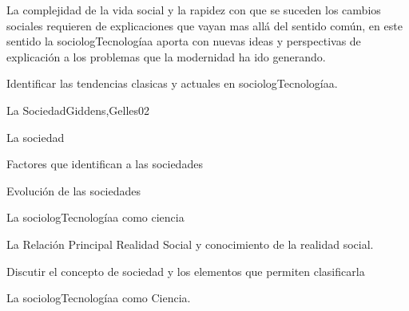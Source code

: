 \begin{syllabus}


\begin{justification}
La complejidad de la vida social y la rapidez con que se suceden los cambios sociales requieren 
de explicaciones que vayan mas allá del sentido común, en este sentido la sociologTecnologíaa 
aporta con nuevas ideas y perspectivas de explicación a los problemas que la modernidad 
ha ido generando.
\end{justification}

\begin{goals}
\item Identificar las tendencias clasicas y actuales en sociologTecnologíaa.
\end{goals}

\begin{outcomes}
\end{outcomes}

\begin{unit}{La Sociedad}{Giddens,Gelles}{0}{2}
    \begin{topics}
      \item La sociedad
      \item Factores que identifican a las sociedades
      \item Evolución de las sociedades
      \item La sociologTecnologíaa como ciencia
      \item La Relación Principal Realidad Social y conocimiento de la realidad social.
    \end{topics}
    \begin{learningoutcomes}
      \item Discutir el concepto de sociedad y los elementos que permiten clasificarla
      \item La sociologTecnologíaa como Ciencia.
    \end{learningoutcomes}
\end{unit}


\end{syllabus}
